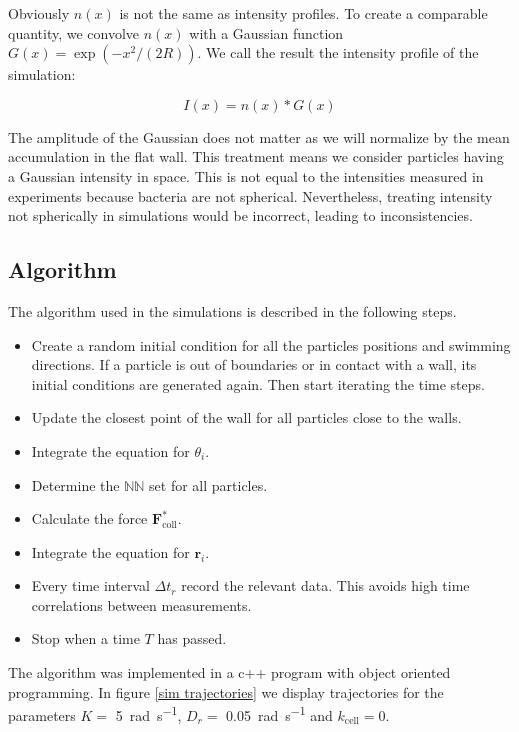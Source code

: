 Obviously $n(x)$ is not the same as intensity profiles. To create a comparable quantity, we convolve $n(x)$ with a Gaussian function $G(x)=\exp(-x^2/(2R))$. We call the result the intensity profile of the simulation:

\begin{equation} \label{eq:Intensity profiles in simulations}
    I(x) = n(x) * G(x)
\end{equation}

The amplitude of the Gaussian does not matter as we will normalize by the mean accumulation in the flat wall. This treatment means we consider particles having a Gaussian intensity in space. This is not equal to the intensities measured in experiments because bacteria are not spherical. Nevertheless, treating intensity not spherically in simulations would be incorrect, leading to inconsistencies.

\subsection{Algorithm}

The algorithm used in the simulations is described in the following steps.

\begin{itemize}
    \item[1.] Create a random initial condition for all the particles positions and swimming directions. If a particle is out of boundaries or in contact with a wall, its initial conditions are generated again. Then start iterating the time steps.
    \item[2.] Update the closest point of the wall for all particles close to the walls.
    \item[3.] Integrate the equation for $\theta_i$.
    \item[4.] Determine the $\mathbb{NN}$ set for all particles.
    \item[5.] Calculate the force $\textbf{F}^*_{\text{coll}}$.
    \item[6.] Integrate the equation for $\textbf{r}_i$.
    \item[7.] Every time interval $\Delta t_r$ record the relevant data. This avoids high time correlations between measurements.
    \item[8.] Stop when a time $T$ has passed.
\end{itemize}

The algorithm was implemented in a c++ program with object oriented programming. In figure \ref{sim trajectories} we display trajectories for the parameters $K=$ \SI[per-mode = symbol]{5}{\radian\per\second}, $D_r=$ \SI[per-mode = symbol]{0.05}{\radian\per\second} and $k_{\text{cell}}=0$.

